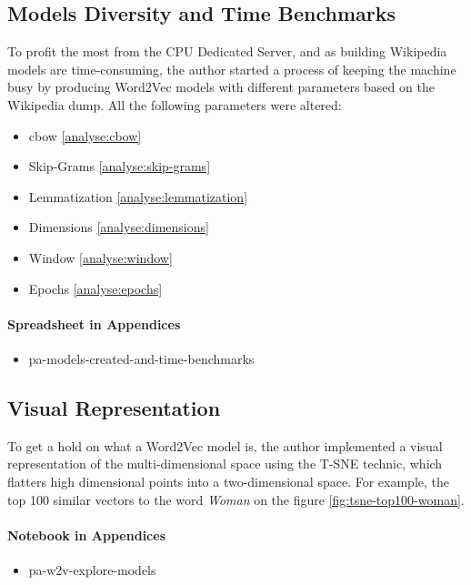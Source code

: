 \subsection{Models Diversity and Time Benchmarks}
To profit the most from the CPU Dedicated Server, and as building Wikipedia models are time-consuming, the author started a process of keeping the machine busy by producing Word2Vec models with different parameters based on the Wikipedia dump. All the following parameters were altered:

\begin{itemize}
    \setlength\itemsep{0em}
    \item \gls{cbow} \ref{analyse:cbow}
    \item Skip-Grams \ref{analyse:skip-grams}
    \item Lemmatization \ref{analyse:lemmatization}
    \item Dimensions \ref{analyse:dimensions}
    \item Window \ref{analyse:window}
    \item Epochs \ref{analyse:epochs}
\end{itemize}

\paragraph{Spreadsheet in Appendices}
\begin{itemize}
    \setlength\itemsep{0em}
    \item pa-models-created-and-time-benchmarks
\end{itemize}


\subsection{Visual Representation}
To get a hold on what a Word2Vec model is, the author implemented a visual representation of the multi-dimensional space using the T-SNE \cite{article:tsne} technic, which flatters high dimensional points into a two-dimensional space. For example, the top 100 similar vectors to the word \textit{Woman} on the figure \ref{fig:tsne-top100-woman}.

\paragraph{Notebook in Appendices}
\begin{itemize}
    \setlength\itemsep{0em}
    \item pa-w2v-explore-models
\end{itemize}

